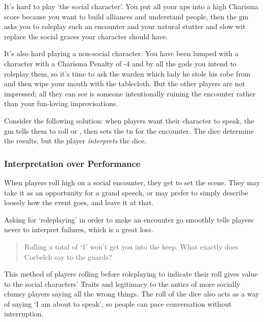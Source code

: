 \begin{multicols}{2}

\noindent
It's hard to play `the social character'.
You put all your \glspl{xp} into a high Charisma score because you want to build alliances and understand people, then the \gls{gm} asks you to roleplay such an encounter and your natural stutter and slow wit replace the social graces your character should have.

It's also hard playing a non-social character.
You have been lumped with a character with a Charisma Penalty of -4 and by all the gods you intend to roleplay them, so it's time to ask the \gls{warden} which lady he stole his robe from and then wipe your mouth with the tablecloth.
But the other players are not impressed; all they can see is someone intentionally ruining the encounter rather than your fun-loving improvisations.

Consider the following solution: when players want their character to speak, the \gls{gm} tells them to roll  or , then sets the \gls{tn} for the encounter.
The dice determine the results, but the player \emph{interprets} the dice.

\subsubsection{Interpretation over Performance}

When players roll high on a social encounter, they get to set the scene.
They may take it as an opportunity for a grand speech, or may prefer to simply describe loosely how the event goes, and leave it at that.

Asking for `roleplaying' in order to make an encounter go smoothly tells players never to interpret failures, which is a great loss.

\begin{quotation}
  Rolling a total of `1' won't get you into the keep.
  What exactly does Corbelch say to the guards?
\end{quotation}
This method of players rolling before roleplaying to indicate their roll gives value to the social characters' Traits and legitimacy to the antics of more socially clumsy players saying all the wrong things.
The roll of the dice also acts as a way of saying `I am about to speak', so people can pace conversation without interruption.

\end{multicols}

